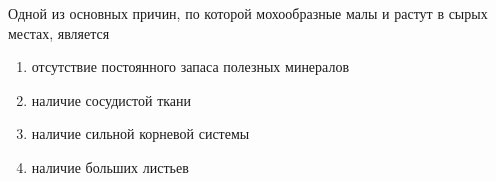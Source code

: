 
Одной
из основных причин, по которой мохообразные малы и растут в сырых местах,
является

\begin{enumerate}
    \item отсутствие постоянного запаса полезных минералов 
    \item наличие сосудистой ткани 
    \item наличие сильной корневой системы 
    \item наличие больших листьев
\end{enumerate}


\explanationSection

